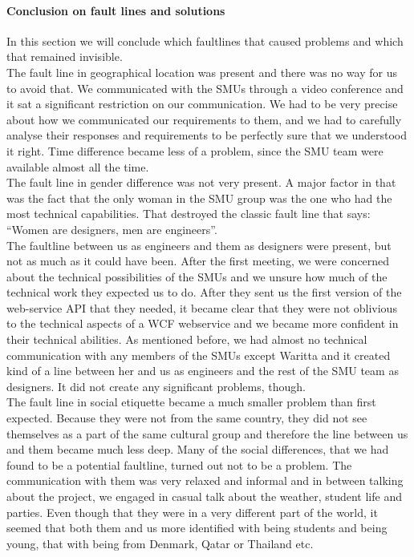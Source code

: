 \documentclass[a4paper,11pt,report]{article}
\begin{document}
\paragraph{Conclusion on fault lines and solutions}
In this section we will conclude which faultlines that caused problems and which that remained invisible. \\

The fault line in geographical location was present and there was no way for us to avoid that. We communicated with the SMUs through a video conference and it sat a significant restriction on our communication. We had to be very precise about how we communicated our requirements to them, and we had to carefully analyse their responses and requirements to be perfectly sure that we understood it right. Time difference became less of a problem, since the SMU team were available almost all the time. \\

The fault line in gender difference was not very present. A major factor in that was the fact that the only woman in the SMU group was the one who had the most technical capabilities. That destroyed the classic fault line that says: “Women are designers, men are engineers”.\\

The faultline between us as engineers and them as designers were present, but not as much as it could have been. After the first meeting, we were concerned about the technical possibilities of the SMUs and we unsure how much of the technical work they expected us to do. After they sent us the first version of the web-service API that they needed, it became clear that they were not oblivious to the technical aspects of a WCF webservice and we became more confident in their technical abilities. As mentioned before, we had almost no technical communication with any members of the SMUs except Waritta and it created kind of a line between her and us as engineers and the rest of the SMU team as designers. It did not create any significant problems, though. \\

The fault line in social etiquette became a much smaller problem than first expected. Because they were not from the same country, they did not see themselves as a part of the same cultural group and therefore the line between us and them became much less deep. Many of the social differences, that we had found to be a potential faultline, turned out not to be a problem. The communication with them was very relaxed and informal and in between talking about the project, we engaged in casual talk about the weather, student life and parties. Even though that they were in a very different part of the world, it seemed that both them and us more identified with being students and being young, that with being from Denmark, Qatar or Thailand etc.\\
\end{document}
